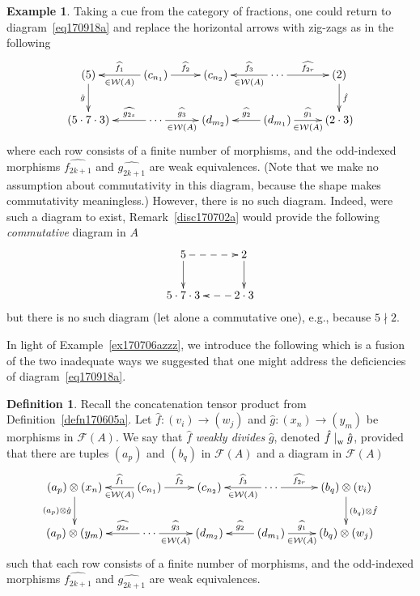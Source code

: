 \documentclass[reqno]{amsart}
\theoremstyle{plain}
\theoremstyle{definition}
\newtheorem{defn}[lem]{Definition}
\newtheorem{ex}[lem]{Example}
\newcommand{\cat}[1]{\mathcal{#1}}
\newcommand{\catw}{\cat{W}}
\newcommand{\catf}{\cat{F}}
\numberwithin{equation}{lem}
\newcommand{\divs}{\mid_{\text w}^{}}
\begin{document}
\begin{ex}
Taking a cue from 
the category of fractions,
one could return to diagram~\eqref{eq170918a} and replace the horizontal
arrows with zig-zags as in the following
$$\xymatrix{
(5)\ar[d]_-{\hat g}
&\ar[l]_-{\widehat{f_1}}^-{\in\catw(A)}(c_{n_1})\ar[r]^-{\widehat{f_2}}
&(c_{n_2})
&\ar[l]_-{\widehat{f_3}}^-{\in\catw(A)}\cdots\ar[r]^-{\widehat{f_{2r}}}
&(2)\ar[d]^-{\hat f}
\\
(5\cdot 7\cdot 3)
&\ar[l]_-{\widehat{g_{2s}}}\cdots\ar[r]^-{\widehat{g_{3}}}_-{\in\catw(A)}
&(d_{m_{2}})
&\ar[l]_-{\widehat{g_{2}}}(d_{m_1})\ar[r]^-{\widehat{g_{1}}}_-{\in\catw(A)}
&(2\cdot 3)
}$$
where each row consists of a finite  number of morphisms, and the 
odd-indexed
morphisms $\widehat{f_{2k+1}}$ and $\widehat{g_{2k+1}}$ 
are weak equivalences.
(Note that we make no assumption about commutativity in this diagram, because the shape makes commutativity meaningless.)
However, there is no such diagram.
Indeed,
were such a diagram to exist, 
Remark~\ref{disc170702a} would provide the following \emph{commutative} diagram in $A$
$$\xymatrix{
5\ar@{-->}[r]\ar[d]
&2\ar[d]
\\
5\cdot 7\cdot 3
&2\cdot 3\ar@{-->}[l]
}$$
but there is no such diagram (let alone a commutative one),
e.g., because $5\nmid 2$.
\end{ex}

In light of Example~\ref{ex170706azzz}, we introduce the following
which is a fusion of the two inadequate ways we suggested that one might 
address the deficiencies of diagram~\eqref{eq170918a}.

\begin{defn}\label{defn170702a}
Recall the concatenation tensor product from Definition~\ref{defn170605a}.
Let $\hat f\colon (v_i)\to(w_j)$ and $\hat g\colon (x_n)\to(y_m)$ be morphisms in $\catf(A)$.
We say that $\hat f$ 
\emph{weakly divides} $\hat g$, denoted $\hat f\divs\hat g$,
provided that there are tuples $(a_p)$ and $(b_q)$ in $\catf(A)$
and a diagram
in $\catf(A)$
\begin{equation}
\label{diag170702a}
\begin{split}
\xymatrix{
(a_p)\otimes(x_n)\ar[d]_-{(a_p)\otimes\hat g}
&\ar[l]_-{\widehat{f_1}}^-{\in\catw(A)}(c_{n_1})\ar[r]^-{\widehat{f_2}}
&(c_{n_2})
&\ar[l]_-{\widehat{f_3}}^-{\in\catw(A)}\cdots\ar[r]^-{\widehat{f_{2r}}}
&(b_q)\otimes(v_i)\ar[d]^-{(b_q)\otimes\hat f}
\\
(a_p)\otimes(y_m)
&\ar[l]_-{\widehat{g_{2s}}}\cdots\ar[r]^-{\widehat{g_{3}}}_-{\in\catw(A)}
&(d_{m_{2}})
&\ar[l]_-{\widehat{g_{2}}}(d_{m_1})\ar[r]^-{\widehat{g_{1}}}_-{\in\catw(A)}
&(b_q)\otimes(w_j)
}
\end{split}
\end{equation}
such that each row consists of a finite  number of morphisms, and the 
odd-indexed
morphisms $\widehat{f_{2k+1}}$ and $\widehat{g_{2k+1}}$ 
are weak equivalences.
\end{defn}
\end{document}
